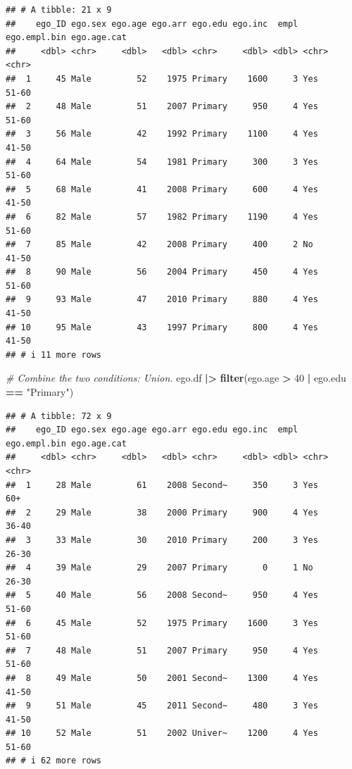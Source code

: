 \documentclass[
]{book}
\newenvironment{Shaded}{\begin{snugshade}}{\end{snugshade}}
\newcommand{\CommentTok}[1]{\textcolor[rgb]{0.56,0.35,0.01}{\textit{#1}}}
\newcommand{\DecValTok}[1]{\textcolor[rgb]{0.00,0.00,0.81}{#1}}
\newcommand{\FunctionTok}[1]{\textcolor[rgb]{0.13,0.29,0.53}{\textbf{#1}}}
\newcommand{\NormalTok}[1]{#1}
\newcommand{\SpecialCharTok}[1]{\textcolor[rgb]{0.81,0.36,0.00}{\textbf{#1}}}
\newcommand{\StringTok}[1]{\textcolor[rgb]{0.31,0.60,0.02}{#1}}
\begin{document}
\begin{verbatim}
## # A tibble: 21 x 9
##    ego_ID ego.sex ego.age ego.arr ego.edu ego.inc  empl ego.empl.bin ego.age.cat
##     <dbl> <chr>     <dbl>   <dbl> <chr>     <dbl> <dbl> <chr>        <chr>      
##  1     45 Male         52    1975 Primary    1600     3 Yes          51-60      
##  2     48 Male         51    2007 Primary     950     4 Yes          51-60      
##  3     56 Male         42    1992 Primary    1100     4 Yes          41-50      
##  4     64 Male         54    1981 Primary     300     3 Yes          51-60      
##  5     68 Male         41    2008 Primary     600     4 Yes          41-50      
##  6     82 Male         57    1982 Primary    1190     4 Yes          51-60      
##  7     85 Male         42    2008 Primary     400     2 No           41-50      
##  8     90 Male         56    2004 Primary     450     4 Yes          51-60      
##  9     93 Male         47    2010 Primary     880     4 Yes          41-50      
## 10     95 Male         43    1997 Primary     800     4 Yes          41-50      
## # i 11 more rows
\end{verbatim}

\begin{Shaded}
\begin{Highlighting}[]
\CommentTok{\# Combine the two conditions: Union.}
\NormalTok{ego.df }\SpecialCharTok{|\textgreater{}} 
  \FunctionTok{filter}\NormalTok{(ego.age }\SpecialCharTok{\textgreater{}} \DecValTok{40} \SpecialCharTok{|}\NormalTok{ ego.edu }\SpecialCharTok{==} \StringTok{"Primary"}\NormalTok{)}
\end{Highlighting}
\end{Shaded}

\begin{verbatim}
## # A tibble: 72 x 9
##    ego_ID ego.sex ego.age ego.arr ego.edu ego.inc  empl ego.empl.bin ego.age.cat
##     <dbl> <chr>     <dbl>   <dbl> <chr>     <dbl> <dbl> <chr>        <chr>      
##  1     28 Male         61    2008 Second~     350     3 Yes          60+        
##  2     29 Male         38    2000 Primary     900     4 Yes          36-40      
##  3     33 Male         30    2010 Primary     200     3 Yes          26-30      
##  4     39 Male         29    2007 Primary       0     1 No           26-30      
##  5     40 Male         56    2008 Second~     950     4 Yes          51-60      
##  6     45 Male         52    1975 Primary    1600     3 Yes          51-60      
##  7     48 Male         51    2007 Primary     950     4 Yes          51-60      
##  8     49 Male         50    2001 Second~    1300     4 Yes          41-50      
##  9     51 Male         45    2011 Second~     480     3 Yes          41-50      
## 10     52 Male         51    2002 Univer~    1200     4 Yes          51-60      
## # i 62 more rows
\end{verbatim}
\end{document}

